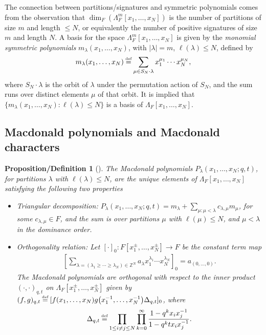 \documentclass[pdftex]{sigma}
\numberwithin{equation}{section}
\newcommand\myeq{\mathrel{\stackrel{\makebox[0pt]{\mbox{\normalfont\tiny def}}}{=}}}
\newtheorem{dfprop}[thm]{Proposition/Definition}
\newcommand{\Z}{\mathbb{Z}}
\begin{document}
The connection between partitions/signatures and symmetric polynomials comes from the observation that $\dim_F \left(\Lambda_F^m[x_1, \dots, x_N]\right)$ is the number of partitions of size $m$ and length $\leq N$, or equivalently the number of positive signatures of size $m$ and length $N$. A basis for the space $\Lambda_F^m[x_1, \dots, x_N]$ is given by the \textit{monomial symmetric polynomials} $m_{\lambda}(x_1, \dots, x_N)$, with $|\lambda| = m$, $\ell(\lambda)\leq N$, def\/ined by
\begin{gather*}
m_{\lambda}(x_1, \dots, x_N) \myeq \sum_{\mu\in S_N\cdot\lambda}{x_1^{\mu_1}\cdots x_N^{\mu_N}},
\end{gather*}
where $S_N\cdot\lambda$ is the orbit of $\lambda$ under the permutation action of $S_N$, and the sum runs over distinct elements $\mu$ of that orbit. It is implied that $\{m_{\lambda}(x_1, \dots, x_N)\colon \ell(\lambda) \leq N\}$ is a basis of $\Lambda_F[x_1, \dots, x_N]$.

\subsection{Macdonald polynomials and Macdonald characters}\label{macdonaldpolysection}

\begin{dfprop}[{\cite[Chapter~VI, Sections~3, 4, 9]{M2}}]\label{def:macdonaldpolys}
The \textit{Macdonald polynomials} $P_{\lambda}(x_1, \dots, x_N; q, t)$, for partitions $\lambda$ with $\ell(\lambda) \leq N$, are the unique elements of $\Lambda_F[x_1, \dots, x_N]$ satisfying the following two properties
\begin{itemize}\itemsep=0pt
	\item \textit{Triangular decomposition}: $\displaystyle P_{\lambda}(x_1, \dots, x_N; q, t) = m_{\lambda} + \sum\limits_{\mu\colon \mu < \lambda}{c_{\lambda, \mu}m_{\mu}}$, for some $c_{\lambda, \mu}\in F$, and the sum is over partitions $\mu$ with $\ell(\mu) \leq N$, and $\mu < \lambda$ in the dominance order.

	\item \textit{Orthogonality relation}: Let $[\cdot]_0 \colon F[x_1^{\pm}, \dots, x_N^{\pm}] \rightarrow F$ be the constant term map
\begin{gather*}
\left[ \sum_{\lambda = (\lambda_1 \geq \cdots \geq \lambda_N) \in \Z^N}{a_{\lambda}x_1^{\lambda_1}\cdots x_N^{\lambda_N}} \right]_0 = a_{(0, \dots, 0)}.
\end{gather*}
The Macdonald polynomials are orthogonal with respect to the inner product $(\cdot, \cdot)_{q, t}$ on $\Lambda_F[x_1^{\pm}, \dots, x_N^{\pm}]$ given by $\displaystyle (f, g)_{q, t} \myeq [f(x_1, \dots, x_N)g\big(x_1^{-1}, \dots, x_N^{-1}\big)\Delta_{q, t}]_0$, where
\[
\Delta_{q, t} \myeq \prod_{1\leq i\neq j\leq N}\prod_{k=0}^{\infty}{\frac{1 - q^{k}x_ix_j^{-1}}{1 - q^{k}tx_ix_j^{-1}}}.
\]
\end{itemize}
\end{dfprop}
\end{document}
